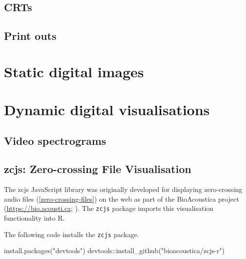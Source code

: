\documentclass[
]{book}
\newenvironment{Shaded}{\begin{snugshade}}{\end{snugshade}}
\newcommand{\FunctionTok}[1]{\textcolor[rgb]{0.00,0.00,0.00}{#1}}
\newcommand{\NormalTok}[1]{#1}
\newcommand{\SpecialCharTok}[1]{\textcolor[rgb]{0.00,0.00,0.00}{#1}}
\newcommand{\StringTok}[1]{\textcolor[rgb]{0.31,0.60,0.02}{#1}}
\begin{document}
\hypertarget{crts}{%
\section{CRTs}\label{crts}}

\hypertarget{print-outs}{%
\section{Print outs}\label{print-outs}}

\hypertarget{static-digital-images}{%
\chapter{Static digital images}\label{static-digital-images}}

\hypertarget{dynamic-digital-visualisations}{%
\chapter{Dynamic digital visualisations}\label{dynamic-digital-visualisations}}

\hypertarget{video-spectrograms}{%
\section{Video spectrograms}\label{video-spectrograms}}

\hypertarget{zcjs-zero-crossing-file-visualisation}{%
\section{zcjs: Zero-crossing File Visualisation}\label{zcjs-zero-crossing-file-visualisation}}

The zcjs JavaScript library was originally developed for displaying zero-crossing audio files (\ref{zero-crossing-files}) on the web as part of the BioAcoustica project (\url{https://bio.acousti.ca}; \citet{baker2015bioacoustica}). The \texttt{zcjs} package \citep{zcjsr} imports this visualisation functionality into R.

The following code installs the \texttt{zcjs} package.

\begin{Shaded}
\begin{Highlighting}[]
\FunctionTok{install.packages}\NormalTok{(}\StringTok{"devtools"}\NormalTok{)}
\NormalTok{devtools}\SpecialCharTok{::}\FunctionTok{install\_github}\NormalTok{(}\StringTok{"bioacoustica/zcjs{-}r"}\NormalTok{)}
\end{Highlighting}
\end{Shaded}
\end{document}
